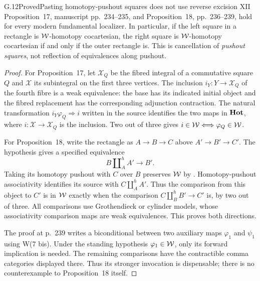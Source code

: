 \begin{claim}{G.12}{Proved}{Pasting homotopy-pushout squares does not use reverse excision}
XII Proposition~17, manuscript pp.~234--235, and Proposition~18, pp.~236--239, hold for every modern fundamental localizer. In particular, if the left square in a rectangle is $\mathcal{W}$-homotopy cocartesian, the right square is $\mathcal{W}$-homotopy cocartesian if and only if the outer rectangle is. This is cancellation of \emph{pushout squares}, not reflection of equivalences along pushout.
\end{claim}
\begin{proof}
For Proposition~17, let $\mathcal X_Q$ be the fibred integral of a commutative square $Q$ and $\mathcal X$ its subintegral on the first three vertices. The inclusion $i_Y:Y\to\mathcal X_Q$ of the fourth fibre is a weak equivalence: the base has its indicated initial object and the fibred replacement has the corresponding adjunction contraction. The natural transformation $i_Y\varphi_Q\Rightarrow i$ written in the source identifies the two maps in $\mathbf{Hot}$, where $i:\mathcal X\to\mathcal X_Q$ is the inclusion. Two out of three gives $i\in\mathcal{W}\Longleftrightarrow\varphi_Q\in\mathcal{W}$.

For Proposition~18, write the rectangle as $A\to B\to C$ above $A'\to B'\to C'$. The hypothesis gives a specified equivalence
\[
B\amalg_A^h A'\longrightarrow B'.
\]
Taking its homotopy pushout with $C$ over $B$ preserves $\mathcal{W}$ by . Homotopy-pushout associativity identifies its source with $C\amalg_A^h A'$. Thus the comparison from this object to $C'$ is in $\mathcal{W}$ exactly when the comparison $C\amalg_B^h B'\to C'$ is, by two out of three. All comparisons use Grothendieck or cylinder models, whose associativity comparison maps are weak equivalences. This proves both directions.

The proof at p.~239 writes a biconditional between two auxiliary maps $\varphi_1$ and $\psi_1$ using W(7 bis). Under the standing hypothesis $\varphi_1\in\mathcal{W}$, only its forward implication is needed. The remaining comparisons have the contractible comma categories displayed there. Thus its stronger invocation is dispensable; there is no counterexample to Proposition~18 itself.
\end{proof}

